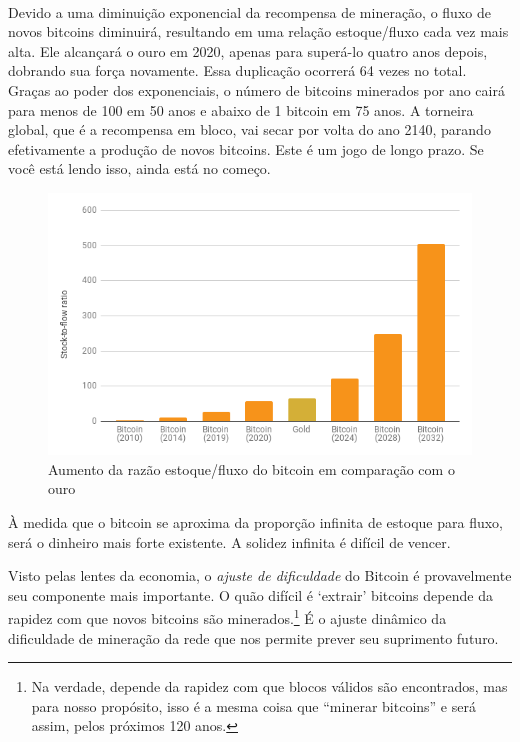 \paragraph{}
Devido a uma diminuição exponencial da recompensa de mineração, o fluxo de novos bitcoins diminuirá, resultando em uma relação estoque/fluxo cada vez mais alta. Ele alcançará o ouro em 2020, apenas para superá-lo quatro anos depois, dobrando sua força novamente. Essa duplicação ocorrerá 64 vezes no total. Graças ao poder dos exponenciais, o número de bitcoins minerados por ano cairá para menos de 100 em 50 anos e abaixo de 1 bitcoin em 75 anos. A torneira global, que é a recompensa em bloco, vai secar por volta do ano 2140, parando efetivamente a produção de novos bitcoins. Este é um jogo de longo prazo. Se você está lendo isso, ainda está no começo.

\begin{figure}
  \includegraphics{assets/images/soundness-over-time.png}
  \caption{Aumento da razão estoque/fluxo do bitcoin em comparação com o ouro}
  \label{fig:soundness-over-time}
\end{figure}

À medida que o bitcoin se aproxima da proporção infinita de estoque para fluxo, será o dinheiro mais forte existente. A solidez infinita é difícil de vencer.

Visto pelas lentes da economia, o \textit{ajuste de dificuldade} do Bitcoin é provavelmente seu componente mais importante. O quão difícil é `extrair' bitcoins depende da rapidez com que novos bitcoins são minerados.\footnote{Na verdade, depende da rapidez com que blocos válidos são encontrados, mas para nosso propósito, isso é a mesma coisa que \enquote{minerar bitcoins} e será assim, pelos próximos 120 anos.} É o ajuste dinâmico da dificuldade de mineração da rede que nos permite prever seu suprimento futuro.

